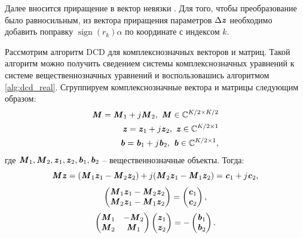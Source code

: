 Далее вносится приращение в вектор невязки . Для того, чтобы преобразование было равносильным, из вектора приращения параметров $\Delta\textbf{\textit{z}}$ необходимо добавить поправку $\operatorname{sign}(r_k)\alpha$ по координате с индексом $k$.

Рассмотрим алгоритм DCD для комплекснозначных векторов и матриц. Такой алгоритм можно получить сведением системы комплекснозначных уравнений к системе вещественнозначных уравнений и воспользовашись алгоритмом \ref{alg:dcd_real}. Сгруппируем комплекснозначные вектора и матрицы следующим образом:
\begin{equation}
	\begin{aligned}
		\textbf{\textit{M}}=\textbf{\textit{M}}_1+j\textbf{\textit{M}}_2, \ \textbf{\textit{M}}\in\mathbb{C}^{K/2\times K/2}\\
		\textbf{\textit{z}}=\textbf{\textit{z}}_1+j\textbf{\textit{z}}_2, \ \textbf{\textit{z}}\in\mathbb{C}^{K/2\times 1}\\
		\textbf{\textit{b}}=\textbf{\textit{b}}_1+j\textbf{\textit{b}}_2, \ \textbf{\textit{b}}\in\mathbb{C}^{K/2\times 1},\\
	\end{aligned}
\end{equation}
где $\textbf{\textit{M}}_1, \textbf{\textit{M}}_2, \textbf{\textit{z}}_1, \textbf{\textit{z}}_2, \textbf{\textit{b}}_1, \textbf{\textit{b}}_2$ -- вещественнозначные объекты. Тогда:
\begin{equation}
	\textbf{\textit{M}}\textbf{\textit{z}}=
	(\textbf{\textit{M}}_1\textbf{\textit{z}}_1-
	\textbf{\textit{M}}_2\textbf{\textit{z}}_2)+
	j(\textbf{\textit{M}}_2\textbf{\textit{z}}_1-
	\textbf{\textit{M}}_1\textbf{\textit{z}}_2)=
	\textbf{\textit{c}}_1+j\textbf{\textit{c}}_2,
\end{equation}
\begin{equation}
	\begin{pmatrix}
		\textbf{\textit{M}}_1\textbf{\textit{z}}_1-
		\textbf{\textit{M}}_2\textbf{\textit{z}}_2\\
		\textbf{\textit{M}}_2\textbf{\textit{z}}_1-
		\textbf{\textit{M}}_1\textbf{\textit{z}}_2
	\end{pmatrix}=
	\begin{pmatrix}
		\textbf{\textit{c}}_1\\
		\textbf{\textit{c}}_2
	\end{pmatrix},
\end{equation}
\begin{equation}
	\begin{pmatrix}
		\textbf{\textit{M}}_1 & -\textbf{\textit{M}}_2\\
		\textbf{\textit{M}}_2 & \textbf{\textit{M}}_1
	\end{pmatrix}
	\begin{pmatrix}
		\textbf{\textit{z}}_1\\
		\textbf{\textit{z}}_2
	\end{pmatrix}=-
	\begin{pmatrix}
		\textbf{\textit{b}}_1\\
		\textbf{\textit{b}}_2
	\end{pmatrix}.
	\label{dcd_real2compl}
\end{equation}
